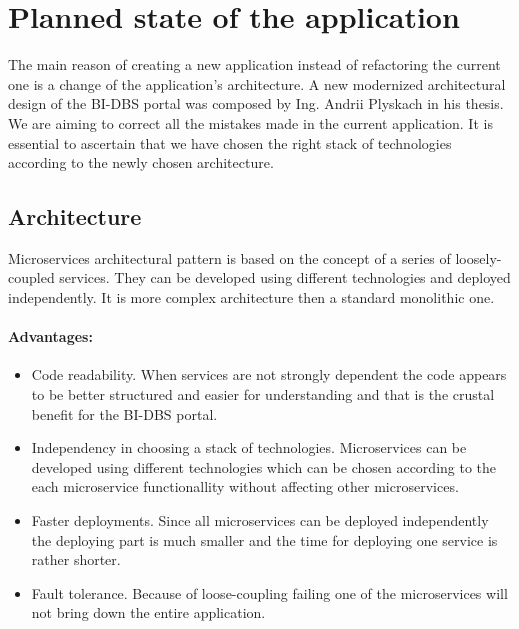 \section{Planned state of the application} The main reason of creating a new application instead of refactoring the current one is a change of the application's architecture. A new modernized architectural design of the BI-DBS portal was composed by Ing. Andrii Plyskach in his thesis. We are aiming to correct all the mistakes made in the current application. It is essential to ascertain that we have chosen the right stack of technologies according to the newly chosen architecture.

\subsection{Architecture}
Microservices architectural pattern is based on the concept of a series of loosely-coupled services. They can be developed using different technologies and deployed independently. It is more complex architecture then a standard monolithic one. 

\paragraph*{Advantages:}
\begin{itemize}
  \item Code readability. When services are not strongly dependent the code appears to be better structured and easier for understanding and that is the crustal benefit for the BI-DBS portal.
  
  \item Independency in choosing a stack of technologies. Microservices can be developed using different technologies which can be chosen according to the each microservice functionallity without affecting other microservices.
  
  \item Faster deployments. Since all microservices can be deployed independently the deploying part is much smaller and the time for deploying one service is rather shorter.

  \item Fault tolerance. Because of loose-coupling failing one of the microservices will not bring down the entire application.
\end{itemize}

